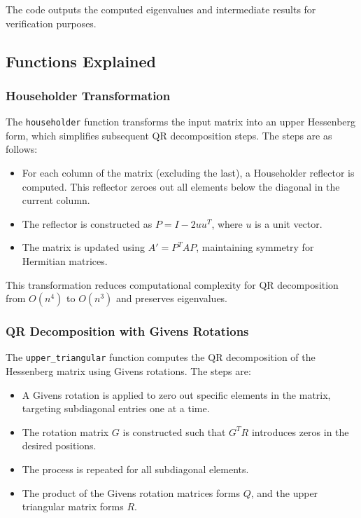 \documentclass[12pt]{article}
\begin{document}
The code outputs the computed eigenvalues and intermediate results for verification purposes.

\subsection{Functions Explained}

\subsubsection{Householder Transformation}

The \texttt{householder} function transforms the input matrix into an upper Hessenberg form, which simplifies subsequent QR decomposition steps. The steps are as follows:
\begin{itemize}
    \item For each column of the matrix (excluding the last), a Householder reflector is computed. This reflector zeroes out all elements below the diagonal in the current column.
    \item The reflector is constructed as \( P = I - 2uu^T \), where \( u \) is a unit vector.
    \item The matrix is updated using \( A' = P^TAP \), maintaining symmetry for Hermitian matrices.
\end{itemize}

This transformation reduces computational complexity for QR decomposition from \( O(n^4) \) to \( O(n^3) \) and preserves eigenvalues.

\subsubsection{QR Decomposition with Givens Rotations}

The \texttt{upper\_triangular} function computes the QR decomposition of the Hessenberg matrix using Givens rotations. The steps are:
\begin{itemize}
    \item A Givens rotation is applied to zero out specific elements in the matrix, targeting subdiagonal entries one at a time.
    \item The rotation matrix \( G \) is constructed such that \( G^T R \) introduces zeros in the desired positions.
    \item The process is repeated for all subdiagonal elements.
    \item The product of the Givens rotation matrices forms \( Q \), and the upper triangular matrix forms \( R \).
\end{itemize}
\end{document}
